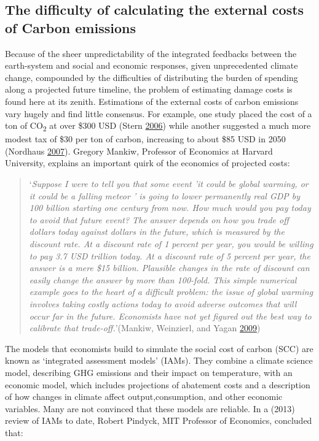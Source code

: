 \documentclass[]{tufte-handout}
\begin{document}
\hypertarget{the-difficulty-of-calculating-the-external-costs-of-carbon-emissions}{%
\subsection{The difficulty of calculating the external costs of Carbon
emissions}\label{the-difficulty-of-calculating-the-external-costs-of-carbon-emissions}}

Because of the sheer unpredictability of the integrated feedbacks
between the earth-system and social and economic responses, given
unprecedented climate change, compounded by the difficulties of
distributing the burden of spending along a projected future timeline,
the problem of estimating damage costs is found here at its zenith.
Estimations of the external costs of carbon emissions vary hugely and
find little consensus. For example, one study placed the cost of a ton
of CO\textsubscript{2} at over \$300 USD (Stern
\protect\hyperlink{ref-Stern2006a}{2006}) while another suggested a much
more modest tax of \$30 per ton of carbon, increasing to about \$85 USD
in 2050 (Nordhaus \protect\hyperlink{ref-Nordhaus2007}{2007}). Gregory
Mankiw, Professor of Economics at Harvard University, explains an
important quirk of the economics of projected costs:

\begin{quote}
`\emph{Suppose I were to tell you that some event 'it could be global
warming, or it could be a falling meteor ' is going to lower permanently
real GDP by 100 billion starting one century from now. How much would
you pay today to avoid that future event? The answer depends on how you
trade off dollars today against dollars in the future, which is measured
by the discount rate. At a discount rate of 1 percent per year, you
would be willing to pay 3.7 USD trillion today. At a discount rate of 5
percent per year, the answer is a mere \$15 billion. Plausible changes
in the rate of discount can easily change the answer by more than
100-fold. This simple numerical example goes to the heart of a difficult
problem: the issue of global warming involves taking costly actions
today to avoid adverse outcomes that will occur far in the future.
Economists have not yet figured out the best way to calibrate that
trade-off.}'(Mankiw, Weinzierl, and Yagan
\protect\hyperlink{ref-Mankiw2009}{2009})
\end{quote}

The models that economists build to simulate the social cost of carbon
(SCC) are known as `integrated assessment models' (IAMs). They combine a
climate science model, describing GHG emissions and their impact on
temperature, with an economic model, which includes projections of
abatement costs and a description of how changes in climate affect
output,consumption, and other economic variables. Many are not convinced
that these models are reliable. In a (2013) review of IAMs to date,
Robert Pindyck, MIT Professor of Economics, concluded that:
\end{document}

